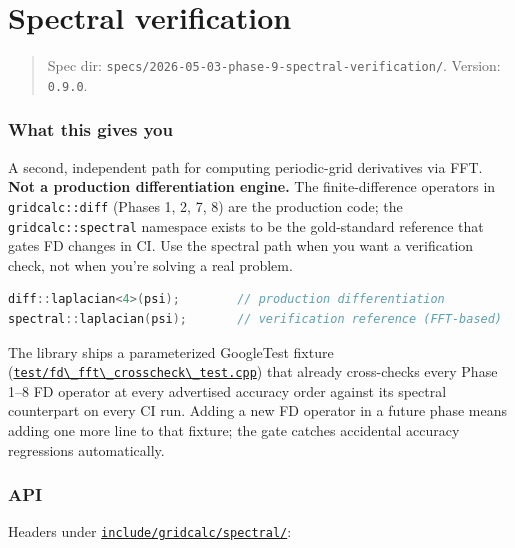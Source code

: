 \chapter{Spectral verification}
\label{chap:spectral-verification}

\begin{quote}
Spec dir:
\passthrough{\lstinline!specs/2026-05-03-phase-9-spectral-verification/!}.
Version: \passthrough{\lstinline!0.9.0!}.
\end{quote}

\subsection{What this gives you}\label{what-this-gives-you}

A second, independent path for computing periodic-grid derivatives via
FFT. \textbf{Not a production differentiation engine.} The
finite-difference operators in \passthrough{\lstinline!gridcalc::diff!}
(Phases 1, 2, 7, 8) are the production code; the
\passthrough{\lstinline!gridcalc::spectral!} namespace exists to be the
gold-standard reference that gates FD changes in CI. Use the spectral
path when you want a verification check, not when you're solving a real
problem.

\begin{lstlisting}[language={C++}]
diff::laplacian<4>(psi);        // production differentiation
spectral::laplacian(psi);       // verification reference (FFT-based)
\end{lstlisting}

The library ships a parameterized GoogleTest fixture
(\href{../../../test/fd_fft_crosscheck_test.cpp}{\passthrough{\lstinline!test/fd\_fft\_crosscheck\_test.cpp!}})
that already cross-checks every Phase 1--8 FD operator at every
advertised accuracy order against its spectral counterpart on every CI
run. Adding a new FD operator in a future phase means adding one more
line to that fixture; the gate catches accidental accuracy regressions
automatically.

\subsection{API}\label{api}

Headers under
\href{../../../include/gridcalc/spectral/}{\passthrough{\lstinline!include/gridcalc/spectral/!}}:

